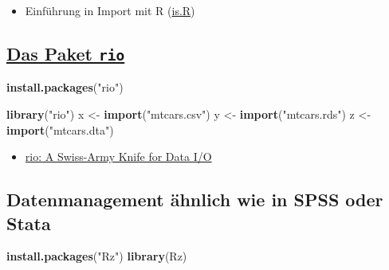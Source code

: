 \documentclass[]{article}
\newenvironment{Shaded}{\begin{snugshade}}{\end{snugshade}}
\newcommand{\KeywordTok}[1]{\textcolor[rgb]{0.13,0.29,0.53}{\textbf{{#1}}}}
\newcommand{\StringTok}[1]{\textcolor[rgb]{0.31,0.60,0.02}{{#1}}}
\newcommand{\NormalTok}[1]{{#1}}
\providecommand{\tightlist}{%
  \setlength{\itemsep}{0pt}\setlength{\parskip}{0pt}}
\begin{document}
\begin{itemize}
\tightlist
\item
  Einführung in Import mit R
  (\href{http://is-r.tumblr.com/post/37181850668/reading-writing-stata-dta-files-with-foreign}{is.R})
\end{itemize}

\subsection{\texorpdfstring{\href{https://cran.r-project.org/web/packages/rio/vignettes/rio.html}{Das
Paket \texttt{rio}}}{Das Paket rio}}\label{das-paket-rio}

\begin{Shaded}
\begin{Highlighting}[]
\KeywordTok{install.packages}\NormalTok{(}\StringTok{"rio"}\NormalTok{)}
\end{Highlighting}
\end{Shaded}

\begin{Shaded}
\begin{Highlighting}[]
\KeywordTok{library}\NormalTok{(}\StringTok{"rio"}\NormalTok{)}
\NormalTok{x <-}\StringTok{ }\KeywordTok{import}\NormalTok{(}\StringTok{"mtcars.csv"}\NormalTok{)}
\NormalTok{y <-}\StringTok{ }\KeywordTok{import}\NormalTok{(}\StringTok{"mtcars.rds"}\NormalTok{)}
\NormalTok{z <-}\StringTok{ }\KeywordTok{import}\NormalTok{(}\StringTok{"mtcars.dta"}\NormalTok{)}
\end{Highlighting}
\end{Shaded}

\begin{itemize}
\tightlist
\item
  \href{https://cran.r-project.org/web/packages/rio/README.html}{rio: A
  Swiss-Army Knife for Data I/O}
\end{itemize}

\subsection{Datenmanagement ähnlich wie in SPSS oder
Stata}\label{datenmanagement-ahnlich-wie-in-spss-oder-stata}

\begin{Shaded}
\begin{Highlighting}[]
\KeywordTok{install.packages}\NormalTok{(}\StringTok{"Rz"}\NormalTok{)}
\KeywordTok{library}\NormalTok{(Rz)}
\end{Highlighting}
\end{Shaded}
\end{document}
